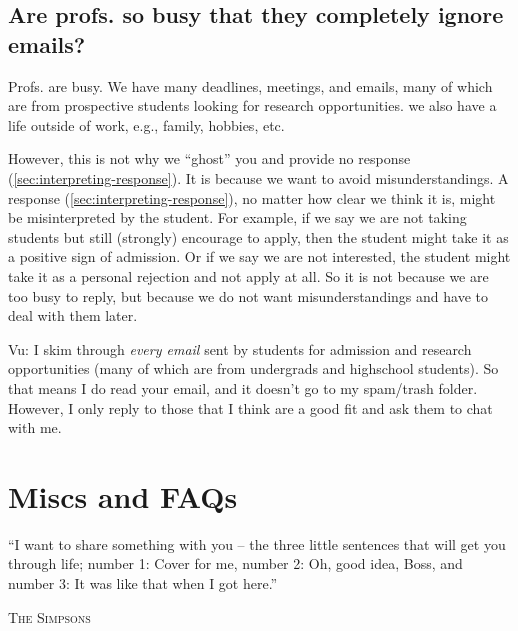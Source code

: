 \documentclass[oneside,11pt,dvipsnames]{book}
\newenvironment{commentbox}[1][]{
  \small
  \begin{mybox}
    {\small \textbf{#1}}
  }{
  \end{mybox}
}
\begin{document}
\section{Are profs. so busy that they completely ignore emails?} \label{sec:busy}

Profs. are busy. We have many deadlines, meetings, and emails, many of which are from prospective students looking for research opportunities. we also have a life outside of work, e.g., family, hobbies, etc. 

However, this is not why we ``ghost'' you and provide no response (\autoref{sec:interpreting-response}).  It is because we want to avoid misunderstandings.  A response (\autoref{sec:interpreting-response}), no matter how clear we think it is, might be misinterpreted by the student.  For example, if we say we are not taking students but still (strongly) encourage to apply, then the student might take it as a positive sign of admission. Or if we say we are not interested, the student might take it as a personal rejection and not apply at all.  So it is not because we are too busy to reply, but because we do not want misunderstandings and have to deal with them later. 




\begin{commentbox}{Vu: }
    I skim through \emph{every email} sent by students for admission and research opportunities (many of which are from undergrads and highschool students). So that means I do read your email, and it doesn't go to my spam/trash folder. 
    However, I only reply to those that I think are a good fit and ask them to chat with me.
    \end{commentbox}
    

\chapter{Miscs and FAQs}\label{sec:faqs}

\epigraph{``I want to share something with you – the three little sentences that will get you through life; number 1: Cover for me, number 2: Oh, good idea, Boss, and number 3: It was like that when I got here.''}{\textsc{The Simpsons}}


\end{document}
